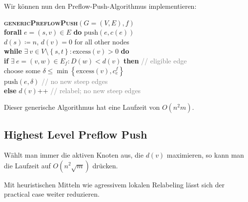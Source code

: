 Wir können nun den Preflow-Push-Algorithmus implementieren:

\begin{pseudocode}
  \textbf{\textsc{genericPreflowPush}}\( (G = (V, E), f) \) \\
  \phantom{\enskip} \textbf{forall} \( e = (s,v) \in E \) \textbf{do} \( \text{push}(e, c(e)) \) \\
  \phantom{\enskip} \( d(s) \coloneqq n \), \( d(v) = 0 \) for all other nodes \\
  \phantom{\enskip} \textbf{while} \( \exists \ v \in V \setminus \left \{ s, t \right \} : \text{excess}(v) > 0 \) \textbf{do} \\
  \phantom{\enskip} \phantom{\enskip} \textbf{if} \( \exists \ e = (v,w) \in E_f : D(w) < d(v) \) \textbf{then} \enskip \textcolor{gray}{// eligible edge} \\
  \phantom{\enskip} \phantom{\enskip} \phantom{\enskip} choose some \( \delta \leq \min \left \{ \text{excess}(v), c_e^f \right \} \) \\
  \phantom{\enskip} \phantom{\enskip} \phantom{\enskip} \( \text{push}(e,\delta) \) \enskip \textcolor{gray}{// no new steep edges} \\
  \phantom{\enskip} \phantom{\enskip} \textbf{else} \( d(v) \)++ \enskip \textcolor{gray}{// relabel; no new steep edges}
  \phantom{\enskip}
\end{pseudocode}

Dieser generische Algorithmus hat eine Laufzeit von \( O(n^2m) \). 

\subsection{Highest Level Preflow Push}

Wählt man immer die aktiven Knoten aus, die \( d(v) \) maximieren, so kann man die Laufzeit auf \( O(n^2\sqrt{m}) \) drücken.

Mit heuristischen Mitteln wie agressivem lokalen Relabeling lässt sich der practical case weiter reduzieren.